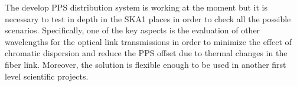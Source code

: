 The develop PPS distribution system is working at the moment but it is 
necessary to test in depth in the SKA1 places in order to check all the 
possible scenarios. Specifically, one of the key aspects is the evaluation of 
other wavelengths for the optical link transmissions in order to minimize the 
effect of chromatic dispersion and reduce the PPS offset due to thermal changes 
in the fiber link. Moreover, the solution is flexible enough to be used in 
another first level scientific projects. 
